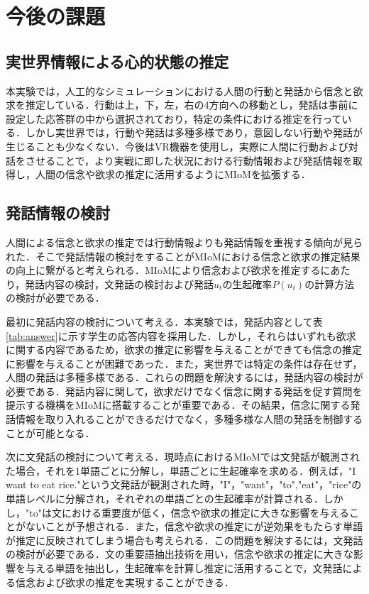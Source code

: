 \chapter{今後の課題}

\section{実世界情報による心的状態の推定}
本実験では，人工的なシミュレーションにおける人間の行動と発話から信念と欲求を推定している．行動は上，下，左，右の4方向への移動とし，発話は事前に設定した応答群の中から選択されており，特定の条件における推定を行っている．しかし実世界では，行動や発話は多種多様であり，意図しない行動や発話が生じることも少なくない．今後はVR機器を使用し，実際に人間に行動および対話をさせることで，より実戦に即した状況における行動情報および発話情報を取得し，人間の信念や欲求の推定に活用するようにMIoMを拡張する．

\section{発話情報の検討}

\par
人間による信念と欲求の推定では行動情報よりも発話情報を重視する傾向が見られた．そこで発話情報の検討をすることがMIoMにおける信念と欲求の推定結果の向上に繋がると考えられる．MIoMにより信念および欲求を推定するにあたり，発話内容の検討，文発話の検討および発話$u_t$の生起確率$P(u_t)$の計算方法の検討が必要である．

\par
最初に発話内容の検討について考える．本実験では，発話内容として表\ref{tab:answer}に示す学生の応答内容を採用した．しかし，それらはいずれも欲求に関する内容であるため，欲求の推定に影響を与えることができても信念の推定に影響を与えることが困難であった．また，実世界では特定の条件は存在せず，人間の発話は多種多様である．これらの問題を解決するには，発話内容の検討が必要である．発話内容に関して，欲求だけでなく信念に関する発話を促す質問を提示する機構をMIoMに搭載することが重要である．その結果，信念に関する発話情報を取り入れることができるだけでなく，多種多様な人間の発話を制御することが可能となる．

\par
次に文発話の検討について考える．現時点におけるMIoMでは文発話が観測された場合，それを1単語ごとに分解し，単語ごとに生起確率を求める．例えば，"I want to eat rice."という文発話が観測された時，"I"，"want"，"to","eat"，"rice"の単語レベルに分解され，それぞれの単語ごとの生起確率が計算される．しかし，"to"は文における重要度が低く，信念や欲求の推定に大きな影響を与えることがないことが予想される．また，信念や欲求の推定にが逆効果をもたらす単語が推定に反映されてしまう場合も考えられる．この問題を解決するには，文発話の検討が必要である．文の重要語抽出技術を用い，信念や欲求の推定に大きな影響を与える単語を抽出し，生起確率を計算し推定に活用することで，文発話による信念および欲求の推定を実現することができる．

